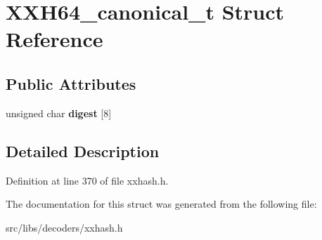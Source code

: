 \hypertarget{structXXH64__canonical__t}{\section{X\-X\-H64\-\_\-canonical\-\_\-t Struct Reference}
\label{structXXH64__canonical__t}
}
\subsection*{Public Attributes}
\begin{DoxyCompactItemize}
\item 
\hypertarget{structXXH64__canonical__t_ad62f1c1b20213c45a6686e1e3446c703}{unsigned char {\bfseries digest} \mbox{[}8\mbox{]}}\label{structXXH64__canonical__t_ad62f1c1b20213c45a6686e1e3446c703}

\end{DoxyCompactItemize}


\subsection{Detailed Description}


Definition at line 370 of file xxhash.\-h.



The documentation for this struct was generated from the following file\-:\begin{DoxyCompactItemize}
\item 
src/libs/decoders/xxhash.\-h\end{DoxyCompactItemize}
